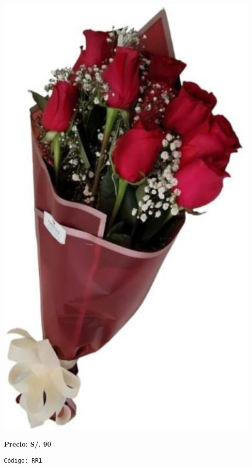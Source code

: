 \documentclass[12pt]{article}
\begin{document}
\begin{minipage}{0.35\textwidth}
    \includegraphics[width=1.0\textwidth]{imagenes_extraidas/image_6_1}
\end{minipage}
\vspace{0.3cm}
\begin{center}
   \textbf{\Large Precio: \textcolor[HTML]{228B22}{S/. 90 }}
\end{center}
\begin{center}
    \textcolor[HTML]{191970}{\texttt{Código: RR1}}
\end{center}
\end{document}
